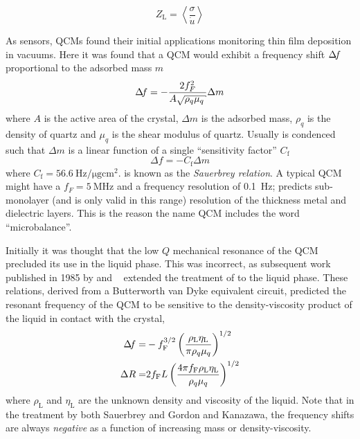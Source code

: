 \begin{equation}
Z_\mathrm{L} = \left<\frac{\sigma}{\dot{u}}\right>
\label{eqn:comsolextract}
\end{equation}



As sensors, QCMs found their initial applications monitoring thin film
deposition in vacuums.  Here it was found that a QCM would exhibit a
frequency shift $\Delta\!f$ proportional to the adsorbed mass $m$
\begin{equation}
 \df=-\frac{2f_{F}^{2}}{A\sqrt{\rho_{q}\mu_{q}}}\Delta m
 \label{eqn:sauerbrey}
\end{equation}
where $A$ is the active area of the crystal, $\Delta m$ is the adsorbed
mass, $\rho_{q}$ is the density of quartz and $\mu_{q}$ is the shear
modulus of quartz. Usually  is condenced such that
$\Delta m$ is a linear function of a single ``sensitivity factor''
$C_\mathrm{f}$
\begin{equation}
 \Delta f=-C_{\text{f}}\Delta m
\end{equation}
where $C_{\text{f}}=\SI{56.6}{\hertz\per\micro\gram\centi\meter\squared}$.
 is known as the
\textit{Sauerbrey relation}.  A typical QCM might have a
$f_F=\SI{5}{\mega\hertz}$ and a frequency resolution of \SI{0.1}{\hertz};
 predicts sub-monolayer (and is only valid in this
range) resolution of the thickness
metal and dielectric layers.  This is the reason the name QCM includes the
word ``microbalance''.

Initially it was thought that the low $Q$ mechanical resonance of the QCM
precluded its use in the liquid phase.  This was incorrect, as subsequent
work published in 1985 by  and ~\cite{guys} extended the
treatment of  to the liquid phase.  These relations,
derived from a Butterworth van Dyke equivalent circuit, predicted the
resonant frequency of the QCM
to be sensitive to the density-viscosity product of the liquid in contact
with the crystal, 
\begin{align}
\Delta\!f=&-f_{\text{F}}^{3/2}\left(\frac{\rho_{\text{L}}\eta_{\text{L}}}{\pi\rho_{q}\mu_{q}}\right)^{1/2}\\
\Delta R=&2f_{\text{F}}L\left(\frac{4\pi
 f_{\text{F}}\rho_{\text{L}}\eta_{\text{L}}}{\rho_{q}\mu_{q}}\right)^{1/2}
\end{align}
where $\rho_{\text{L}}$ and $\eta_{\text{L}}$ are the unknown density and
viscosity of the liquid.  Note that in the treatment by both Sauerbrey and
Gordon and Kanazawa, the frequency shifts are always \textit{negative} as a
function of increasing mass or density-viscosity.

